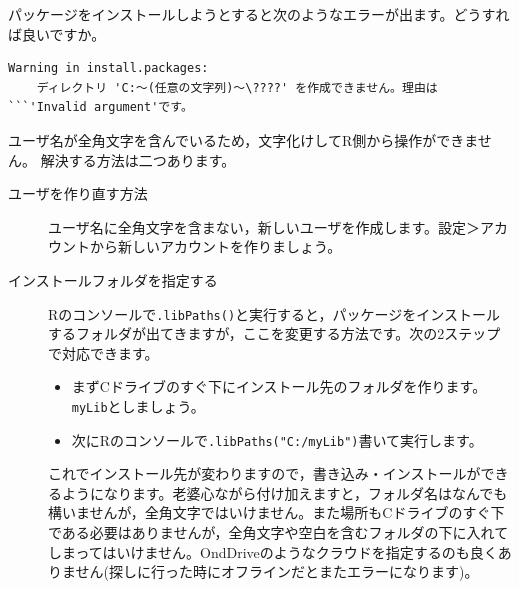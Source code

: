 \documentclass{ltjsbook}
\begin{document}
\begin{FAQ}{パッケージをインストールしようとすると次のようなエラーが出ます。どうすれば良いですか。}{}
	\begin{verbatim}
Warning in install.packages:
    ディレクトリ 'C:〜(任意の文字列)〜\????' を作成できません。理由は```'Invalid argument'です。
\end{verbatim}
	ユーザ名が全角文字を含んでいるため，文字化けしてR側から操作ができません。
	解決する方法は二つあります。
	\begin{description}
		\item [ユーザを作り直す方法] ユーザ名に全角文字を含まない，新しいユーザを作成します。設定＞アカウントから新しいアカウントを作りましょう。
		\item [インストールフォルダを指定する] Rのコンソールで\verb|.libPaths()|と実行すると，パッケージをインストールするフォルダが出てきますが，ここを変更する方法です。次の2ステップで対応できます。
		      \begin{itemize}
			      \item まずCドライブのすぐ下にインストール先のフォルダを作ります。\verb|myLib|としましょう。
			      \item 次にRのコンソールで\verb|.libPaths("C:/myLib")|書いて実行します。
		      \end{itemize}
		      これでインストール先が変わりますので，書き込み・インストールができるようになります。老婆心ながら付け加えますと，フォルダ名はなんでも構いませんが，全角文字ではいけません。また場所もCドライブのすぐ下である必要はありませんが，全角文字や空白を含むフォルダの下に入れてしまってはいけません。OndDriveのようなクラウドを指定するのも良くありません(探しに行った時にオフラインだとまたエラーになります)。
	\end{description}
\end{FAQ}
\end{document}
